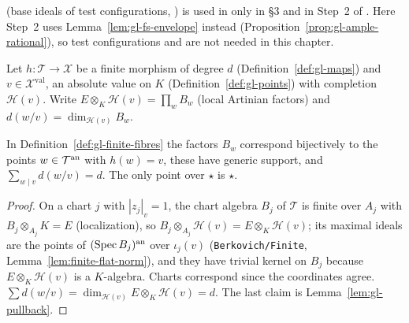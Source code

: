 \begin{remark}\label{rmk:gl-test-configurations}
\cite[Proposition~2.5(2)]{FHX} (base ideals of test configurations, \cite[Lemma~5.22]{BJ22}) is used in \cite{FHX} only in \S3 and in Step~2 of
\cite[Theorem~6.1]{FHX}. Here Step~2 uses Lemma~\ref{lem:gl-fs-envelope} instead (Proposition~\ref{prop:gl-ample-rational}), so test configurations and
\cite[Theorem~2.31]{BJ22} are not needed in this chapter.
\end{remark}

\begin{definition}\label{def:gl-finite-fibres}
\leanok
{}
Let $h\colon\mathcal T\to\mathcal X$ be a finite morphism of degree $d$ (Definition~\ref{def:gl-maps}) and $v\in\mathcal X^{\mathrm{val}}$, an absolute value on
$K$ (Definition~\ref{def:gl-points}) with completion $\mathcal H(v)$. Write $E\otimes_K\mathcal H(v)=\prod_wB_w$ (local Artinian factors) and
$d(w/v)=\dim_{\mathcal H(v)}B_w$.
\end{definition}

\begin{lemma}\label{lem:gl-finite-fibres}
\leanok
{}
In Definition~\ref{def:gl-finite-fibres} the factors $B_w$ correspond bijectively to the points $w\in\mathcal T^{\mathrm{an}}$ with $h(w)=v$, these have generic support,
and $\sum_{w\mid v}d(w/v)=d$. The only point over $\star$ is $\star$.
\end{lemma}

\begin{proof}
On a chart $j$ with $|z_j|_v=1$, the chart algebra $B_j$ of $\mathcal T$ is finite over $A_j$ with $B_j\otimes_{A_j}K=E$ (localization), so
$B_j\otimes_{A_j}\mathcal H(v)=E\otimes_K\mathcal H(v)$; its maximal ideals are the points of $(\operatorname{Spec} B_j)^{\mathrm{an}}$ over $\iota_j(v)$ (\texttt{Berkovich/Finite},
Lemma~\ref{lem:finite-flat-norm}), and they have trivial kernel on $B_j$ because $E\otimes_K\mathcal H(v)$ is a $K$-algebra. Charts correspond since the
coordinates agree. $\sum d(w/v)=\dim_{\mathcal H(v)}E\otimes_K\mathcal H(v)=d$. The last claim is Lemma~\ref{lem:gl-pullback}.
\end{proof}

